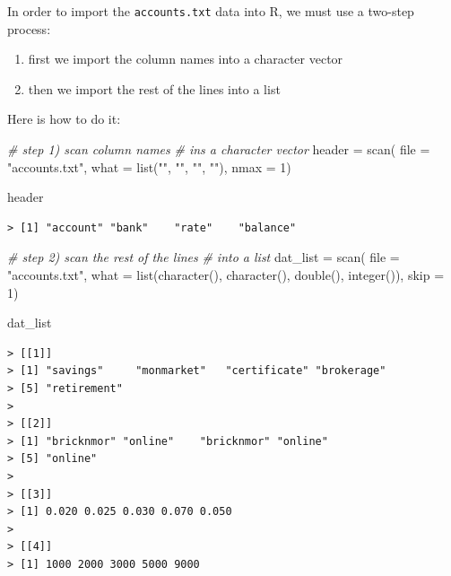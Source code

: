 \documentclass[
]{book}
\newenvironment{Shaded}{\begin{snugshade}}{\end{snugshade}}
\newcommand{\AttributeTok}[1]{\textcolor[rgb]{0.77,0.63,0.00}{#1}}
\newcommand{\CommentTok}[1]{\textcolor[rgb]{0.56,0.35,0.01}{\textit{#1}}}
\newcommand{\DecValTok}[1]{\textcolor[rgb]{0.00,0.00,0.81}{#1}}
\newcommand{\FunctionTok}[1]{\textcolor[rgb]{0.00,0.00,0.00}{#1}}
\newcommand{\NormalTok}[1]{#1}
\newcommand{\OtherTok}[1]{\textcolor[rgb]{0.56,0.35,0.01}{#1}}
\newcommand{\StringTok}[1]{\textcolor[rgb]{0.31,0.60,0.02}{#1}}
\begin{document}
In order to import the \texttt{accounts.txt} data into R, we must use a two-step
process:

\begin{enumerate}
\def\labelenumi{\arabic{enumi})}
\item
  first we import the column names into a character vector
\item
  then we import the rest of the lines into a list
\end{enumerate}

Here is how to do it:

\begin{Shaded}
\begin{Highlighting}[]
\CommentTok{\# step 1) scan column names}
\CommentTok{\# ins a character vector}
\NormalTok{header }\OtherTok{=} \FunctionTok{scan}\NormalTok{(}
  \AttributeTok{file =} \StringTok{"accounts.txt"}\NormalTok{, }
  \AttributeTok{what =} \FunctionTok{list}\NormalTok{(}\StringTok{""}\NormalTok{, }\StringTok{""}\NormalTok{, }\StringTok{""}\NormalTok{, }\StringTok{""}\NormalTok{), }
  \AttributeTok{nmax =} \DecValTok{1}\NormalTok{)}

\NormalTok{header}
\end{Highlighting}
\end{Shaded}

\begin{verbatim}
> [1] "account" "bank"    "rate"    "balance"
\end{verbatim}

\begin{Shaded}
\begin{Highlighting}[]
\CommentTok{\# step 2) scan the rest of the lines}
\CommentTok{\# into a list}
\NormalTok{dat\_list }\OtherTok{=} \FunctionTok{scan}\NormalTok{(}
  \AttributeTok{file =} \StringTok{"accounts.txt"}\NormalTok{, }
  \AttributeTok{what =} \FunctionTok{list}\NormalTok{(}\FunctionTok{character}\NormalTok{(), }\FunctionTok{character}\NormalTok{(), }\FunctionTok{double}\NormalTok{(), }\FunctionTok{integer}\NormalTok{()),}
  \AttributeTok{skip =} \DecValTok{1}\NormalTok{)}

\NormalTok{dat\_list}
\end{Highlighting}
\end{Shaded}

\begin{verbatim}
> [[1]]
> [1] "savings"     "monmarket"   "certificate" "brokerage"  
> [5] "retirement" 
> 
> [[2]]
> [1] "bricknmor" "online"    "bricknmor" "online"   
> [5] "online"   
> 
> [[3]]
> [1] 0.020 0.025 0.030 0.070 0.050
> 
> [[4]]
> [1] 1000 2000 3000 5000 9000
\end{verbatim}
\end{document}
